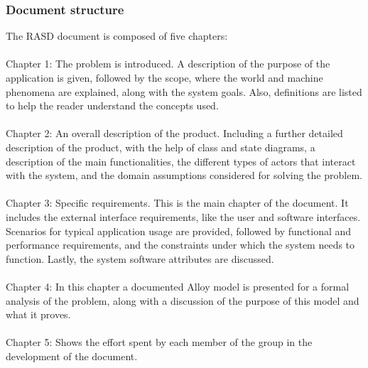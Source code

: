 \subsubsection{Document structure}
The RASD document is composed of five chapters:\\\\
Chapter 1: The problem is introduced. A description of the purpose of the application is given, followed by the scope, where the world and machine phenomena are explained, along with the system goals. Also, definitions are listed to help the reader understand the concepts used.\\\\
Chapter 2: An overall description of the product. Including a further detailed description of the product, with the help of class and state diagrams, a description of the main functionalities, the different types of actors that interact with the system, and the domain assumptions considered for solving the problem.\\\\
Chapter 3: Specific requirements. This is the main chapter of the document. It includes the external interface requirements, like the user and software interfaces. Scenarios for typical application usage are provided, followed by functional and performance requirements, and the constraints under which the system needs to function. Lastly, the system software attributes are discussed.\\\\
Chapter 4: In this chapter a documented Alloy model is presented for a formal analysis of the problem, along with a discussion of the purpose of this model and what it proves.\\\\
Chapter 5: Shows the effort spent by each member of the group in the development of the document.
